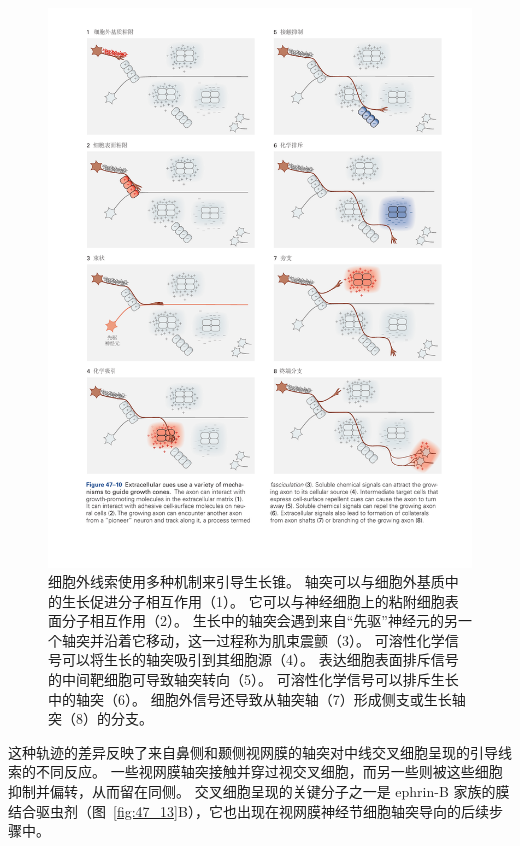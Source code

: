 \begin{figure}[htbp]
	\centering
	\includegraphics[width=1.0\linewidth]{chap47/fig_47_10}
	\caption{细胞外线索使用多种机制来引导生长锥。
		轴突可以与细胞外基质中的生长促进分子相互作用（1）。
		它可以与神经细胞上的粘附细胞表面分子相互作用（2）。
		生长中的轴突会遇到来自“先驱”神经元的另一个轴突并沿着它移动，这一过程称为肌束震颤（3）。
		可溶性化学信号可以将生长的轴突吸引到其细胞源（4）。
		表达细胞表面排斥信号的中间靶细胞可导致轴突转向（5）。
		可溶性化学信号可以排斥生长中的轴突（6）。
		细胞外信号还导致从轴突轴（7）形成侧支或生长轴突（8）的分支。}
	\label{fig:47_10}
\end{figure}


这种轨迹的差异反映了来自鼻侧和颞侧视网膜的轴突对中线交叉细胞呈现的引导线索的不同反应。
一些视网膜轴突接触并穿过视交叉细胞，而另一些则被这些细胞抑制并偏转，从而留在同侧。
交叉细胞呈现的关键分子之一是 ephrin-B 家族的膜结合驱虫剂（图~\ref{fig:47_13}B），它也出现在视网膜神经节细胞轴突导向的后续步骤中。


